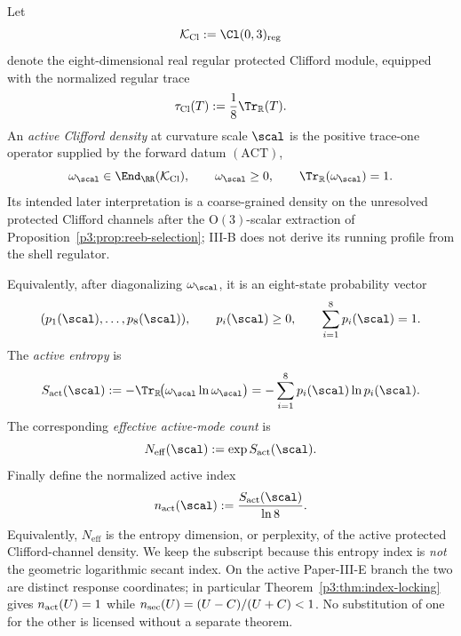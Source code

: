\documentclass[11pt,a4paper]{article}
\begin{document}
\begin{definition}
\label{p3:def:Neff}
Let
\[
        \mathcal K_{\rm Cl}:=\Cl(0,3)_{\rm reg}
\]
denote the eight-dimensional real regular protected Clifford module, equipped
with the normalized regular trace
\[
        \tau_{\rm Cl}(T):=\frac{1}{8}\Tr_{\mathbb R}(T).
\]
An \emph{active Clifford density} at curvature scale \(\scal\) is the positive
trace-one operator supplied by the forward datum \((\mathrm{ACT})\),
\[
        \omega_{\scal}\in \End_{\RR}(\mathcal K_{\rm Cl}),
        \qquad
        \omega_{\scal}\ge0,
        \qquad
        \Tr_{\mathbb R}(\omega_{\scal})=1.
\]
Its intended later interpretation is a coarse-grained density on the unresolved
protected Clifford channels after the \(\mathrm O(3)\)-scalar extraction of
Proposition~\ref{p3:prop:reeb-selection}; III-B does not derive its running
profile from the shell regulator.

Equivalently, after diagonalizing \(\omega_{\scal}\), it is an eight-state
probability vector
\[
        (p_1(\scal),\ldots,p_8(\scal)),
        \qquad
        p_i(\scal)\ge0,
        \qquad
        \sum_{i=1}^8p_i(\scal)=1.
\]
The \emph{active entropy} is
\begin{equation}
\label{p3:eq:active_entropy}
S_{\mathrm{act}}(\scal)
:=
-\Tr_{\mathbb R}\!\bigl(\omega_{\scal}\ln\omega_{\scal}\bigr)
=
-\sum_{i=1}^8p_i(\scal)\ln p_i(\scal).
\end{equation}
The corresponding \emph{effective active-mode count} is
\begin{equation}
\label{p3:eq:active_mode_count}
N_{\mathrm{eff}}(\scal):=\exp S_{\mathrm{act}}(\scal).
\end{equation}
Finally define the normalized active index
\begin{equation}
\label{p3:eq:active_index_entropy}
n_{\mathrm{act}}(\scal):=\frac{S_{\mathrm{act}}(\scal)}{\ln 8}.
\end{equation}
Equivalently, \(N_{\mathrm{eff}}\) is the entropy dimension, or perplexity, of
the active protected Clifford-channel density.  We keep the subscript because
this entropy index is \emph{not} the geometric logarithmic secant index.  On
the active Paper-III-E branch the two are distinct response coordinates; in
particular Theorem~\ref{p3:thm:index-locking} gives
\(n_{\rm act}(U)=1\) while \(n_{\rm sec}(U)=(U-C)/(U+C)<1\).  No
substitution of one for the other is licensed without a separate theorem.
\end{definition}
\end{document}
